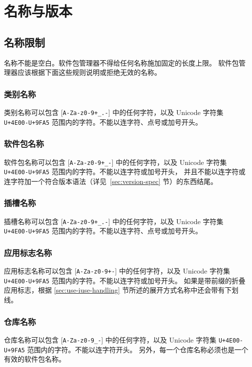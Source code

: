 \chapter{名称与版本}

\section{名称限制}

名称不能是空白。软件包管理器不得给任何名称施加固定的长度上限。
软件包管理器应该根据下面这些规则说明或拒绝无效的名称。

\subsection{类别名称}
\label{sec:category-names}
类别名称可以包含 [\texttt{A-Za-z0-9+_.-}] 中的任何字符，以及 Unicode 字符集
\texttt{U+4E00-U+9FA5} 范围内的字符。不能以连字符、点号或加号开头。

\subsection{软件包名称}
\label{sec:package-names}
软件包名称可以包含 [\texttt{A-Za-z0-9+_-}] 中的任何字符，以及 Unicode 字符集
\texttt{U+4E00-U+9FA5} 范围内的字符。不能以连字符或加号开头，
并且不能以连字符或连字符加一个符合版本语法（详见~\ref{sec:version-spec} 节）的东西结尾。


\subsection{插槽名称}
\label{sec:slot-names}
插槽名称可以包含 [\texttt{A-Za-z0-9+_.-}] 中的任何字符，以及 Unicode 字符集
\texttt{U+4E00-U+9FA5} 范围内的字符。不能以连字符、点号或加号开头。

\subsection{应用标志名称}
应用标志名称可以包含 [\texttt{A-Za-z0-9+-}] 中的任何字符，以及 Unicode 字符集
\texttt{U+4E00-U+9FA5} 范围内的字符。不能以连字符或加号开头。
如果是带前缀的折叠应用标志，根据 \ref{sec:use-iuse-handling}
节所述的展开方式名称中还会带有下划线。

\subsection{仓库名称}
\label{sec:repository-names}
仓库名称可以包含 [\texttt{A-Za-z0-9_-}] 中的任何字符，以及 Unicode 字符集
\texttt{U+4E00-U+9FA5} 范围内的字符。不能以连字符开头。
另外，每一个仓库名称必须也是一个有效的软件包名称。

